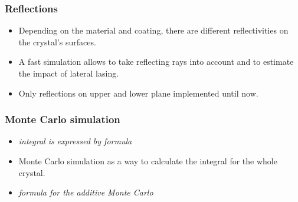 \subsubsection{Reflections}

\begin{itemize}

  \item Depending on the material and coating, there are different
    reflectivities on the crystal's surfaces.

  \item A fast simulation allows to take reflecting rays into account and to
    estimate the impact of lateral lasing.

  \item Only reflections on upper and lower plane implemented until now.

\end{itemize}



\subsubsection{Monte Carlo simulation}
\label{label:monteCarlo}

\begin{itemize}

  \item \textit{integral is expressed by formula} \cite[Daniel's Thesis]{ASE2010}

  \item Monte Carlo simulation as a way to calculate the integral for the whole
    crystal.

  \item \textit{formula for the additive Monte Carlo}

\end{itemize}






